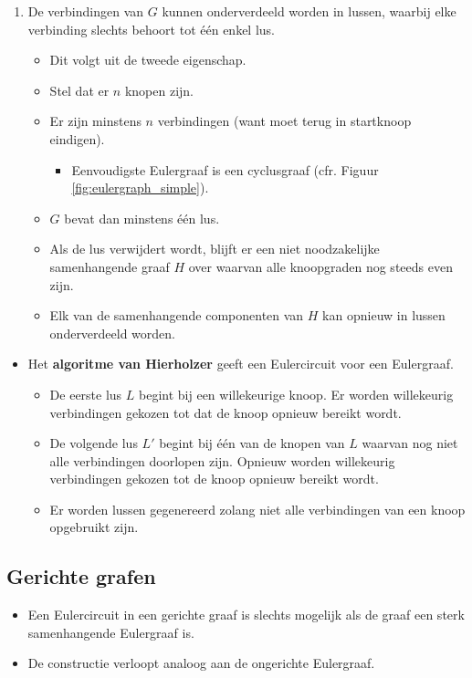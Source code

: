 \begin{itemize}
\begin{enumerate}
		\item De verbindingen van $G$ kunnen onderverdeeld worden in lussen, waarbij elke verbinding slechts behoort tot één enkel lus.
		\begin{itemize}
			\item Dit volgt uit de tweede eigenschap.
			\item Stel dat er $n$ knopen zijn.
			\item Er zijn minstens $n$ verbindingen (want moet terug in startknoop eindigen).
			\begin{itemize}
				\item Eenvoudigste Eulergraaf is een cyclusgraaf (cfr. Figuur \ref{fig:eulergraph_simple}).
			\end{itemize}
			\item $G$ bevat dan minstens één lus.
			\item Als de lus verwijdert wordt, blijft er een niet noodzakelijke samenhangende graaf $H$ over waarvan alle knoopgraden nog steeds even zijn.
			\item Elk van de samenhangende componenten van $H$ kan opnieuw in lussen onderverdeeld worden.
		\end{itemize}
	\end{enumerate}
	\begin{itemize}
		\item Het \textbf{algoritme van Hierholzer} geeft een Eulercircuit voor een Eulergraaf.
		\begin{itemize}
			\item De eerste lus $L$ begint bij een willekeurige knoop. Er worden willekeurig verbindingen gekozen tot dat de knoop opnieuw bereikt wordt.
			\item De volgende lus $L'$ begint bij één van de knopen van $L$ waarvan nog niet alle verbindingen doorlopen zijn. Opnieuw worden willekeurig verbindingen gekozen tot de knoop opnieuw bereikt wordt.
			\item Er worden lussen gegenereerd zolang niet alle verbindingen van een knoop opgebruikt zijn.
		\end{itemize}
	\end{itemize}
\end{itemize}



\subsection{Gerichte grafen}
\begin{itemize}
	\item Een Eulercircuit in een gerichte graaf is slechts mogelijk als de graaf een sterk samenhangende Eulergraaf is.
	\item De constructie verloopt analoog aan de ongerichte Eulergraaf.
\end{itemize}